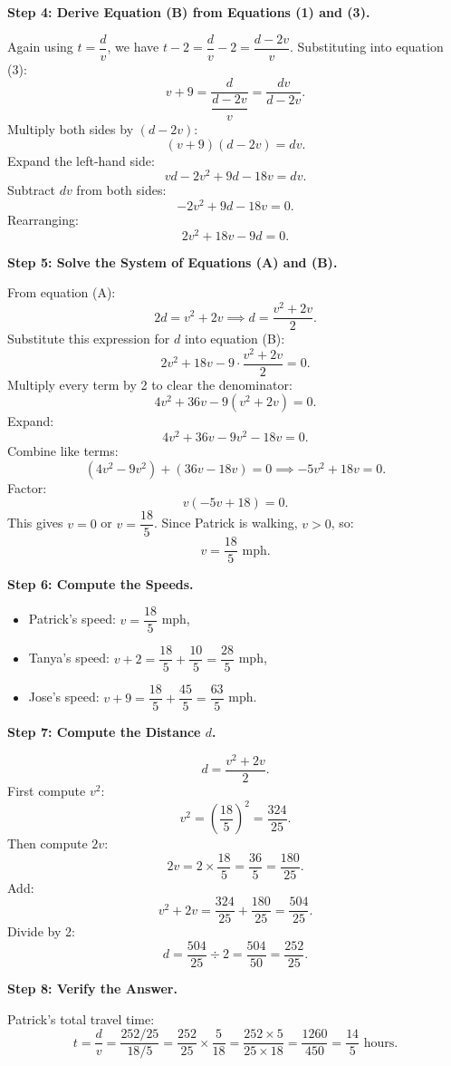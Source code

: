 \documentclass{article}
\begin{document}
\begin{tcolorbox}[title=Teacher Model, breakable]
\medskip
\textbf{Step 4: Derive Equation (B) from Equations (1) and (3).}

Again using $t = \dfrac{d}{v}$, we have $t - 2 = \dfrac{d}{v} - 2 = \dfrac{d-2v}{v}$.
Substituting into equation (3):
\[
v+9 = \frac{d}{\dfrac{d-2v}{v}} = \frac{dv}{d-2v}.
\]
Multiply both sides by $(d-2v)$:
\[
(v+9)(d-2v) = dv.
\]
Expand the left-hand side:
\[
vd - 2v^2 + 9d - 18v = dv.
\]
Subtract $dv$ from both sides:
\[
-2v^2 + 9d - 18v = 0.
\]
Rearranging:
\[
2v^2 + 18v - 9d = 0. \tag{B}
\]

\medskip
\textbf{Step 5: Solve the System of Equations (A) and (B).}

From equation (A):
\[
2d = v^2 + 2v \implies d = \frac{v^2+2v}{2}.
\]
Substitute this expression for $d$ into equation (B):
\[
2v^2 + 18v - 9\cdot\frac{v^2+2v}{2} = 0.
\]
Multiply every term by 2 to clear the denominator:
\[
4v^2 + 36v - 9(v^2+2v) = 0.
\]
Expand:
\[
4v^2 + 36v - 9v^2 - 18v = 0.
\]
Combine like terms:
\[
(4v^2 - 9v^2) + (36v - 18v) = 0 \implies -5v^2 + 18v = 0.
\]
Factor:
\[
v(-5v + 18) = 0.
\]
This gives $v = 0$ or $v = \dfrac{18}{5}$. Since Patrick is walking, $v > 0$,
so:
\[
v = \frac{18}{5} \text{ mph}.
\]

\medskip
\textbf{Step 6: Compute the Speeds.}

\begin{itemize}
  \item Patrick's speed: $v = \dfrac{18}{5}$ mph,
  \item Tanya's speed: $v+2 = \dfrac{18}{5} + \dfrac{10}{5} = \dfrac{28}{5}$ mph,
  \item Jose's speed: $v+9 = \dfrac{18}{5} + \dfrac{45}{5} = \dfrac{63}{5}$ mph.
\end{itemize}

\medskip
\textbf{Step 7: Compute the Distance $d$.}

\[
d = \frac{v^2 + 2v}{2}.
\]
First compute $v^2$:
\[
v^2 = \left(\frac{18}{5}\right)^2 = \frac{324}{25}.
\]
Then compute $2v$:
\[
2v = 2 \times \frac{18}{5} = \frac{36}{5} = \frac{180}{25}.
\]
Add:
\[
v^2 + 2v = \frac{324}{25} + \frac{180}{25} = \frac{504}{25}.
\]
Divide by 2:
\[
d = \frac{504}{25} \div 2 = \frac{504}{50} = \frac{252}{25}.
\]

\medskip
\textbf{Step 8: Verify the Answer.}

Patrick's total travel time:
\[
t = \frac{d}{v} = \frac{252/25}{18/5} = \frac{252}{25} \times \frac{5}{18}
= \frac{252 \times 5}{25 \times 18} = \frac{1260}{450} = \frac{14}{5} \text{ hours}.
\]


\end{tcolorbox}
\end{document}
